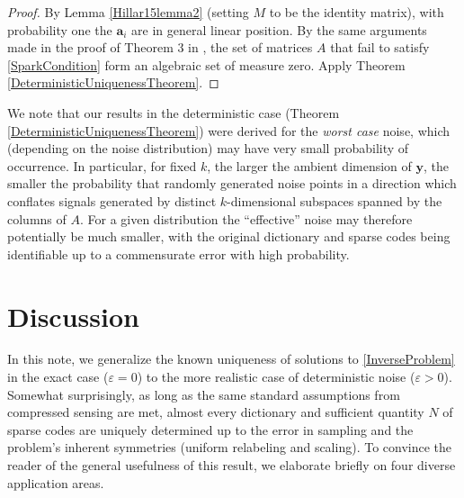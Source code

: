 \documentclass[journal, onecolumn]{IEEEtran}
\begin{document}
\begin{proof}
By Lemma \ref{Hillar15lemma2} (setting $M$ to be the identity matrix), with probability one the $\mathbf{a}_i$ are in general linear position. By the same arguments made in the proof of Theorem 3 in \cite{Hillar15}, the set of matrices $A$ that fail to satisfy \eqref{SparkCondition} form an algebraic set of measure zero. Apply Theorem \ref{DeterministicUniquenessTheorem}.
\end{proof}

We note that our results in the deterministic case (Theorem \ref{DeterministicUniquenessTheorem}) were derived for the \emph{worst case} noise, which (depending on the noise distribution) may have very small probability of occurrence. In particular, for fixed $k$, the larger the ambient dimension of $\mathbf{y}$, the smaller the probability that randomly generated noise points in a direction which conflates signals generated by distinct $k$-dimensional subspaces spanned by the columns of $A$. For a given distribution the ``effective'' noise may therefore potentially be much smaller, with the original dictionary and sparse codes being identifiable up to a commensurate error with high probability. 

\section{Discussion}

In this note, we generalize the known uniqueness of solutions to \eqref{InverseProblem} in the exact case ($\varepsilon = 0$) to the more realistic case of deterministic noise ($\varepsilon > 0$).  Somewhat surprisingly, as long as the same standard assumptions from compressed sensing are met, almost every dictionary and sufficient quantity $N$ of sparse codes are uniquely determined up to the error in sampling and the problem's inherent symmetries (uniform relabeling and scaling). To convince the reader of the general usefulness of this result, we elaborate briefly on four diverse application areas.

%
\end{document}
